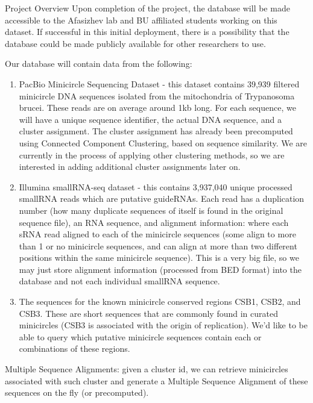 \documentclass[a4paper,10pt,notitlepage]{article}
\begin{document}
\begin{section}{Project Overview}
Upon completion of the project, the database will be made accessible to the Afasizhev lab and BU affiliated 
students working on this dataset. If successful in this initial deployment, there is a possibility that the 
database could be made publicly available for other researchers to use.


Our database will contain data from the following:

\begin{enumerate}
\item PacBio Minicircle Sequencing Dataset - this dataset contains 39,939 filtered minicircle DNA sequences isolated from the mitochondria of Trypanosoma brucei. These reads are on average around 1kb long. For each sequence, we will have a unique sequence identifier, the actual DNA sequence, and a cluster assignment. The cluster assignment has already been precomputed using Connected Component Clustering, based on sequence similarity. We are currently in the process of applying other clustering methods, so we are interested in adding additional cluster assignments later on.
\item Illumina smallRNA-seq dataset - this contains 3,937,040 unique processed smallRNA reads which are putative 
guideRNAs. Each read has a duplication number (how many duplicate sequences of itself is found in the original 
sequence file), an RNA sequence, and alignment information: where each sRNA read aligned to each of the 
minicircle sequences (some align to more than 1 or no minicircle sequences, and can align at more than two 
different positions within the same minicircle sequence). This is a very big file, so we may just store alignment
information (processed from BED format) into the database and not each individual smallRNA sequence.
\item The sequences for the known minicircle conserved regions CSB1, CSB2, and CSB3. These are short sequences that are commonly found in curated minicircles (CSB3 is associated with the origin of replication). We’d like to be able to query which putative minicircle sequences contain each or combinations of these regions. 
    \end{enumerate}

Multiple Sequence Alignments: given a cluster id, we can retrieve minicircles associated with such cluster and 
generate a Multiple Sequence Alignment of these sequences on the fly (or precomputed).


\end{section}
\end{document}
